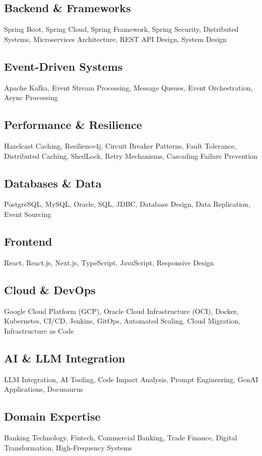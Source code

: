 \documentclass[]{hanisntsolo-resume}
\begin{document}
\subsection{Backend \& Frameworks}
Spring Boot, Spring Cloud, Spring Framework, Spring Security, Distributed Systems, Microservices Architecture, REST API Design, System Design

\subsection{Event-Driven Systems}
Apache Kafka, Event Stream Processing, Message Queues, Event Orchestration, Async Processing

\subsection{Performance \& Resilience}
Hazelcast Caching, Resilience4j, Circuit Breaker Patterns, Fault Tolerance, Distributed Caching, ShedLock, Retry Mechanisms, Cascading Failure Prevention

\subsection{Databases \& Data}
PostgreSQL, MySQL, Oracle, SQL, JDBC, Database Design, Data Replication, Event Sourcing

\subsection{Frontend}
React, React.js, Next.js, TypeScript, JavaScript, Responsive Design

\subsection{Cloud \& DevOps}
Google Cloud Platform (GCP), Oracle Cloud Infrastructure (OCI), Docker, Kubernetes, CI/CD, Jenkins, GitOps, Automated Scaling, Cloud Migration, Infrastructure as Code

\subsection{AI \& LLM Integration}
LLM Integration, AI Tooling, Code Impact Analysis, Prompt Engineering, GenAI Applications, Docusaurus

\subsection{Domain Expertise}
Banking Technology, Fintech, Commercial Banking, Trade Finance, Digital Transformation, High-Frequency Systems
\end{document}
